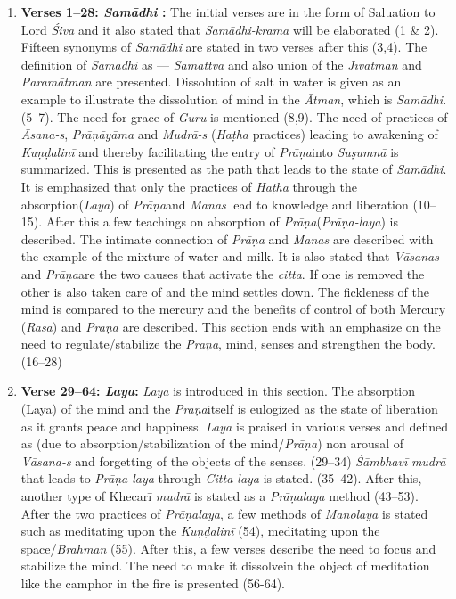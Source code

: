 \begin{enumerate}
\item \textbf{Verses 1--28:  \textit{Samādhi} :} The initial verses are in the form of Saluation to Lord \textit{Śiva} and it also stated that \textit{Samādhi-krama} will be elaborated (1 \& 2). Fifteen synonyms of \textit{Samādhi} are stated in two verses after this (3,4). The definition of \textit{Samādhi} as --- \textit{Samattva} and also union of the \textit{Jīvātman} and \textit{Paramātman} are presented. Dissolution of salt in water is given as an example to illustrate the dissolution of mind in the \textit{Ātman}, which is \textit{Samādhi}.(5--7). The need for grace of \textit{Guru} is mentioned (8,9). The need of practices of \textit{Āsana-s}, \textit{Prāṇāyāma} and \textit{Mudrā-s} (\textit{Haṭha} practices) leading to awakening of \textit{Kuṇḍalinī}  and thereby facilitating the entry of \textit{Prāṇa}into \textit{Suṣumnā} is summarized. This is presented as the path that leads to the state of \textit{Samādhi}. It is emphasized that only the practices of \textit{Haṭha} through the absorption(\textit{Laya}) of \textit{Prāṇa}and \textit{Manas} lead to  knowledge and liberation (10--15). After this a few teachings on absorption of \textit{Prāṇa}(\textit{Prāṇa-laya}) is described. The intimate connection of \textit{Prāṇa} and \textit{Manas} are described with the example of the mixture of water and milk. It is also stated that \textit{Vāsanas} and \textit{Prāṇa}are the two causes that activate the \textit{citta}. If one is removed the other is also taken care of and the mind settles down. The fickleness of the mind is compared to the mercury and the benefits of control of both Mercury (\textit{Rasa}) and \textit{Prāṇa} are described. This section ends with an emphasize on the need to regulate/stabilize the \textit{Prāṇa}, mind, senses and strengthen the body.(16--28)

\item \textbf{Verse 29--64: \textit{Laya}:} \textit{Laya} is introduced in this section.  The absorption (Laya) of the mind and the \textit{Prāṇa}itself is eulogized as the state of liberation as it grants peace and happiness. \textit{Laya} is praised in various verses and defined as (due to absorption/stabilization of the mind/\textit{Prāṇa}) non arousal of \textit{Vāsana-s} and forgetting of the objects of the senses. (29--34) \textit{Śāmbhavī} \textit{mudrā} that leads to \textit{Prāṇa-laya} through \textit{Citta-laya} is stated. (35--42). After this, another type of Khecarī \textit{mudrā} is stated as a \textit{Prāṇalaya} method (43--53). After the two practices of \textit{Prāṇalaya}, a few methods of \textit{Manolaya} is stated such as meditating upon the \textit{Kuṇḍalinī}  (54), meditating upon the space/\textit{Brahman} (55). After this, a few verses describe the need to focus and stabilize the mind. The need to make it  dissolvein the object of meditation like the camphor in the fire is presented (56-64).


\end{enumerate}
